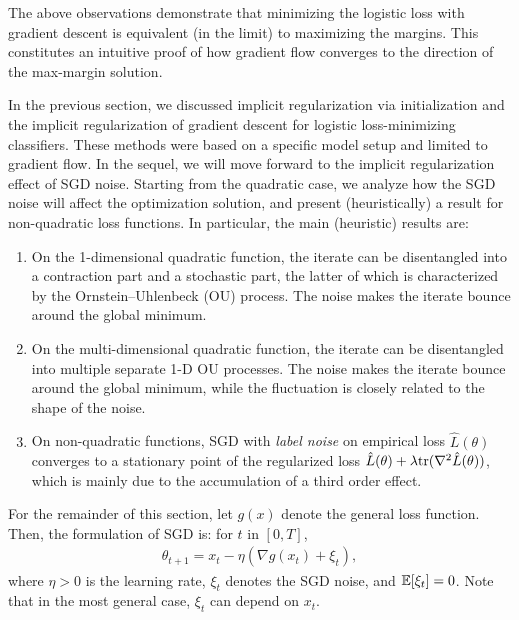 The above observations demonstrate that minimizing the logistic loss with gradient descent is equivalent (in the limit) to maximizing the margins. This constitutes an intuitive proof of how gradient flow converges to the direction of the max-margin solution.


In the previous section, we discussed implicit regularization via initialization and the implicit regularization of gradient descent for logistic loss-minimizing classifiers. These methods were based on a specific model setup and limited to gradient flow. In the sequel, we will move forward to the implicit regularization effect of SGD noise. Starting from the quadratic case, we analyze how the SGD noise will affect the optimization solution, and present (heuristically) a result for non-quadratic loss functions. In particular, the main (heuristic) results are:
\begin{enumerate}
\item On the 1-dimensional quadratic function, the iterate can be disentangled into a contraction part and a stochastic part, the latter of which is characterized by the Ornstein–Uhlenbeck (OU) process. The noise makes the iterate bounce around the global minimum.
\item On the multi-dimensional quadratic function, the iterate can be disentangled into multiple separate 1-D OU processes. The noise makes the iterate bounce around the global minimum, while the fluctuation is closely related to the shape of the noise.
\item On non-quadratic functions, SGD with \textit{label noise} on empirical loss $\hat{L}(\theta)$ converges to a stationary point of the regularized loss $\hat{L}(\theta) + \lambda \textup{tr}(\nabla^2\hat{L}(\theta))$, which is mainly due to the accumulation of a third order effect.
\end{enumerate}
 

For the remainder of this section, let $g(x)$ denote the general loss function. Then, the formulation of SGD is: for $t$ in $[0,T]$,
\begin{align}
\theta_{t+1} = x_{t} - \eta(\nabla g(x_{t}) + \xi_t),
\end{align} 
where $\eta > 0$ is the learning rate, $\xi_t$ denotes the SGD noise, and $\operatorname*{\mathbb{E}}[\xi_t] = 0$. Note that in the most general case, $\xi_t$ can depend on $x_t$.
	
